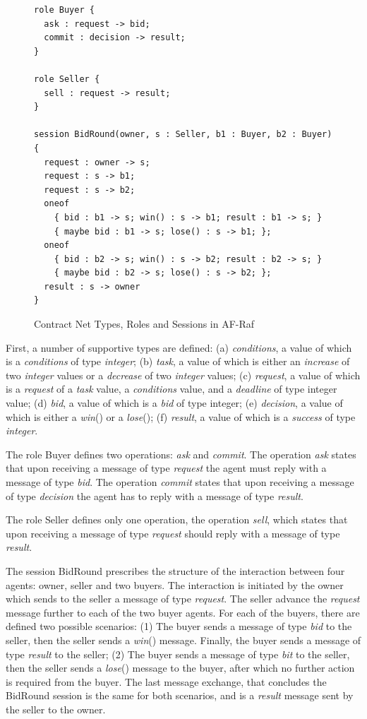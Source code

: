 \documentclass[a4paper,12pt,oneside,fleqn]{book} %
\begin{document}
{\begin{figure}
\begin{verbatim}
role Buyer {
  ask : request -> bid;
  commit : decision -> result;
}

role Seller {
  sell : request -> result;
}

session BidRound(owner, s : Seller, b1 : Buyer, b2 : Buyer) {
  request : owner -> s;
  request : s -> b1;
  request : s -> b2;
  oneof
    { bid : b1 -> s; win() : s -> b1; result : b1 -> s; }
    { maybe bid : b1 -> s; lose() : s -> b1; };
  oneof
    { bid : b2 -> s; win() : s -> b2; result : b2 -> s; }
    { maybe bid : b2 -> s; lose() : s -> b2; };
  result : s -> owner
}
\end{verbatim}
\caption{Contract Net Types, Roles and Sessions in AF-Raf}
\label{fig:contract-roles}
\end{figure} %

First, a number of supportive types are defined: (a) \textit{conditions}, a
value of which is a \textit{conditions} of type \textit{integer}; (b)
\textit{task}, a value of which is either an \textit{increase} of two
\textit{integer} values or a \textit{decrease} of two \textit{integer}
values; (c) \textit{request}, a value of which is a \textit{request} of a
\textit{task} value, a \textit{conditions} value, and a \textit{deadline}
of type integer value; (d) \textit{bid}, a value of which is a \textit{bid}
of type integer; (e) \textit{decision}, a value of which is either a
\textit{win}() or a \textit{lose}(); (f) \textit{result}, a value of which
is a \textit{success} of type \textit{integer}.

The role Buyer defines two operations: \textit{ask} and \textit{commit}.
The operation \textit{ask} states that upon receiving a message of type
\textit{request} the agent must reply with a message of type \textit{bid}.
The operation \textit{commit} states that upon receiving a message of type
\textit{decision} the agent has to reply with a message of type
\textit{result}.

The role Seller defines only one operation, the operation \textit{sell},
which states that upon receiving a message of type \textit{request} should
reply with a message of type \textit{result}.

The session BidRound prescribes the structure of the interaction between
four agents: owner, seller and two buyers. The interaction is initiated by
the owner which sends to the seller a message of type \textit{request}. The
seller advance the \textit{request} message further to each of the two
buyer agents. For each of the buyers, there are defined two possible
scenarios: (1) The buyer sends a message of type \textit{bid} to the
seller, then the seller sends a \textit{win}() message. Finally, the buyer
sends a message of type \textit{result} to the seller; (2) The buyer sends
a message of type \textit{bit} to the seller, then the seller sends a
\textit{lose}() message to the buyer, after which no further action is
required from the buyer. The last message exchange, that concludes the
BidRound session is the same for both scenarios, and is a \textit{result}
message sent by the seller to the owner.

}
\end{document}
